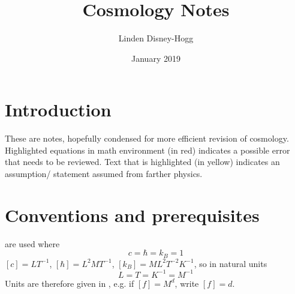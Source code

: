 \documentclass{article}
\title{Cosmology Notes}
\author{Linden Disney-Hogg}
\date{January 2019}
\begin{document}
\maketitle
\tableofcontents

\section{Introduction}
These are notes, hopefully condensed for more efficient revision of cosmology. Highlighted equations in math environment (in red) indicates a possible error that needs to be reviewed. Text that is highlighted (in yellow) indicates an assumption/ statement assumed from farther physics. 

\section{Conventions and prerequisites}

\begin{definition}
 are used where
\[
c=\hbar=k_B = 1
\]
$[c]=LT^{-1}$, $[\hbar]=L^2 M T^{-1}$, $[k_B] = ML^2 T^{-2} K^{-1}$, so in natural units
\[
L=T=K^{-1}=M^{-1}
\]
Units are therefore given in , e.g. if $[f]=M^d$, write $[f]=d$.
\end{definition}
\end{document}
